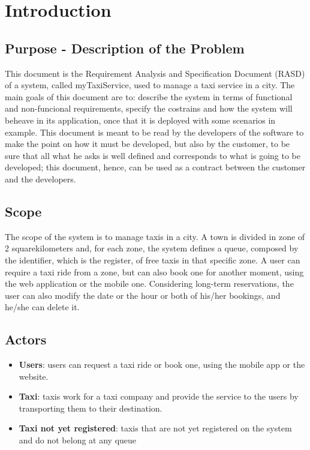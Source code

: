 \section{Introduction}
	\subsection{Purpose - Description of the Problem}
	This document is the Requirement Analysis and Specification Document (RASD) of a system, called myTaxiService, used to manage a taxi service in a city. The main goals of this document are to: describe the system in terms of functional and non-funcional requirements, specify the costrains and how the system will beheave in its application, once that it is deployed with some scenarios in example. This document is meant to be read by the developers of the software to make the point on how it must be developed, but also by the customer, to be sure that all what he asks is well defined and corresponds to what is going to be developed; this document, hence, can be used as a contract between the customer and the developers.
		
	\subsection{Scope}
	The scope of the system is to manage taxis in a city. A town is divided in zone of 2 squarekilometers and, for each zone, the system defines a queue, composed by the identifier, which is the register, of free taxis in that specific zone. A user can require a taxi ride from a zone, but can also book one for another moment, using the web application or the mobile one. Considering long-term reservations, the user can also modify the date or the hour or both of his/her bookings, and he/she can delete it. 
	
	\subsection{Actors}
	\begin{itemize}
		\item \textbf{Users}: users can request a taxi ride or book one, using the mobile app or the website.
		\item \textbf{Taxi}: taxis work for a taxi company and provide the service to the users by transporting them to their destination.
		\item \textbf{Taxi not yet registered}: taxis that are not yet registered on the system and do not belong at any queue
	\end{itemize}
	
